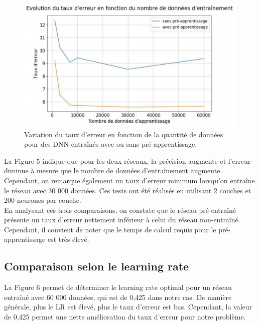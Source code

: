 \begin{figure}[H]\includegraphics[width=140mm]
{images/graph2.png}
\caption{Variation du taux d'erreur en fonction de la quantité de données pour des DNN entraînés avec ou sans pré-apprentissage.}
\end{figure}
La Figure 5 indique que pour les deux réseaux, la précision augmente et l'erreur diminue à mesure que le nombre de données d'entraînement augmente. Cependant, on remarque également un taux d'erreur minimum lorsqu'on entraîne le réseau avec 30 000 données. Ces tests ont été réalisés en utilisant 2 couches et 200 neurones par couche.\\
En analysant ces trois comparaisons, on constate que le réseau pré-entraîné présente un taux d'erreur nettement inférieur à celui du réseau non-entraîné. Cependant, il convient de noter que le temps de calcul requis pour le pré-apprentissage est très élevé.

\subsection{Comparaison selon le learning rate}

La Figure 6 permet de déterminer le learning rate optimal pour un réseau entraîné avec 60 000 données, qui est de 0,425 dans notre cas. De manière générale, plus le LR est élevé, plus le taux d'erreur est bas. Cependant, la valeur de 0,425 permet une nette amélioration du taux d'erreur pour notre problème.

